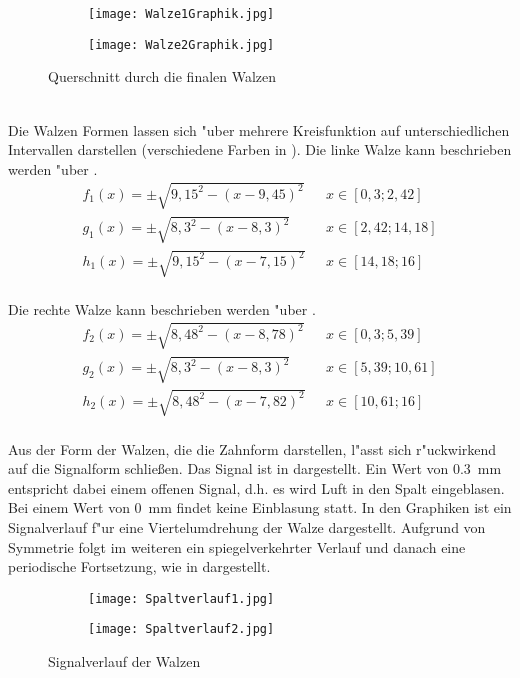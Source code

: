 \begin{figure}[h]
	\centering
	\begin{subfigure}[c]{0.4\textwidth}		
		\texttt{[image: Walze1Graphik.jpg]}
	\end{subfigure}
	\begin{subfigure}[c]{0.4\textwidth}
		\texttt{[image: Walze2Graphik.jpg]}
	\end{subfigure}
	\caption{Querschnitt durch die finalen Walzen}
	\label{fig:finalesdesign}
\end{figure}\\

Die Walzen Formen lassen sich "uber mehrere Kreisfunktion auf unterschiedlichen Intervallen darstellen (verschiedene Farben in ). Die linke Walze kann beschrieben werden "uber .
\begin{align}
	{f_1(x)}=\pm\sqrt{9,15^{2}-(x-9,45)^{2}}\,\,\,\,&x\in[0,3; 2,42] \label{eq:Walze1}\\
	{g_1(x)}=\pm\sqrt{8,3^{2}-(x-8,3)^{2}}\,\,\,\,&x\in[2,42; 14,18] \nonumber\\
	{h_1(x)}=\pm\sqrt{9,15^{2}-(x-7,15)^{2}}\,\,\,\,&x\in[14,18; 16] \nonumber
\end{align}\\
Die rechte Walze kann beschrieben werden "uber .
\begin{align}
	{f_2(x)}=\pm\sqrt{8,48^{2}-(x-8,78)^{2}}\,\,\,\,&x\in[0,3; 5,39] \label{eq:Walze2}\\
	{g_2(x)}=\pm\sqrt{8,3^{2}-(x-8,3)^{2}}\,\,\,\,&x\in[5,39; 10,61] \nonumber\\
	{h_2(x)}=\pm\sqrt{8,48^{2}-(x-7,82)^{2}}\,\,\,\,&x\in[10,61; 16] \nonumber
\end{align}\\
Aus der Form der Walzen, die die Zahnform darstellen, l"asst sich r"uckwirkend auf die Signalform schlie\ss{}en. Das Signal ist in  dargestellt. Ein Wert von \SI{0,3}{\milli\meter} entspricht dabei einem offenen Signal, d.h. es wird Luft in den Spalt eingeblasen. Bei einem Wert von \SI{0}{\milli\meter} findet keine Einblasung statt. In den Graphiken ist ein Signalverlauf f"ur eine Viertelumdrehung der Walze dargestellt. Aufgrund von Symmetrie folgt im weiteren ein spiegelverkehrter Verlauf und danach eine periodische Fortsetzung, wie in  dargestellt.
\begin{figure}[h]
	\centering
	\begin{subfigure}[c]{0.5\textwidth}		
		\texttt{[image: Spaltverlauf1.jpg]}
	\end{subfigure}
	\begin{subfigure}[c]{0.5\textwidth}
		\texttt{[image: Spaltverlauf2.jpg]}
	\end{subfigure}
	\caption{Signalverlauf der Walzen}
	\label{fig:spaltverlauf}
\end{figure}\\
